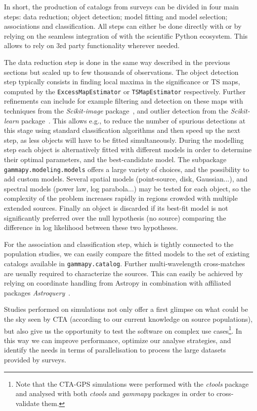 \documentclass[longauth]{aa}
\newcommand{\code}[1]{\texttt{#1}}
\begin{document}
In short, the production of catalogs from \gammaray surveys can be divided in
four main steps: data reduction; object detection; model fitting and model
selection; associations and classification. All steps can either be done directly
with \gammapy or by relying on the seamless integration
of \gammapy with the scientific Python ecosystem. This allows to rely
on 3rd party functionality wherever needed.

The \iacts data reduction step is done in the same way described in the 
previous sections but scaled up to few thousands of observations. The object
detection step typically consists in finding local maxima in the significance or TS maps,
computed by the \code{ExcessMapEstimator} or \code{TSMapEstimator} respectively.
 Further refinements can
include for example filtering and detection on these maps with techniques from
the \textit{Scikit-image} package~\citep{scikit-image}, and outlier detection from
the \textit{Scikit-learn} package~\citep{scikit-learn}. This allows e.g., to 
reduce the number of spurious detections at this stage using standard
classification algorithms and then speed up the next step,
as less objects will have to be fitted simultaneously. During the modelling
step each object is alternatively fitted with different models in order to
determine their optimal parameters, and the best-candidate model. The
subpackage \code{gammapy.modeling.models} offers a large variety of choices, and the
possibility to add custom models.  Several spatial models (point-source, disk,
Gaussian...), and spectral models (power law, log parabola...) may be tested
for each object, so the complexity of the problem increases rapidly in regions
crowded with multiple extended sources. Finally an object is discarded if its
best-fit model is not significantly preferred over the null hypothesis (no
source) comparing the difference in log likelihood between these two
hypotheses.

For the association and classification step, which is tightly connected to the
population studies, we can easily compare the fitted models to the set of
existing \gammaray catalogs available in \code{gammapy.catalog}. Further
multi-wavelength cross-matches are usually required to characterize the
sources. This can easily be achieved by relying on coordinate
handling from Astropy in combination with affiliated packages
\textit{Astroquery}~\citep{astroquery}.

Studies performed on simulations not only offer a first glimpse on what could
be the sky seen by CTA (according to our current knowledge on source
populations), but also give us the opportunity to test the software on complex
use cases\footnote{Note that the CTA-GPS simulations were performed with the
	\textit{ctools} package~\citep{2016A&A...593A...1K} and analysed with both
	\textit{ctools} and \textit{gammapy} packages in order to cross-validate
	them.}. In this way we can improve performance, optimize our analyse strategies, and
identify the needs in terms of parallelisation to process the large datasets
provided by surveys.
\end{document}
